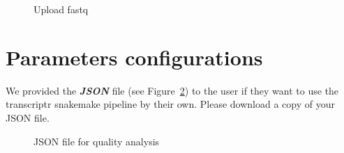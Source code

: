 \documentclass[
  a4paper,
  DIV=11,
  numbers=noendperiod,
  oneside,
  open=any]{scrreport}
\begin{document}
\begin{figure}[H]


\caption{\label{fig-qual2}Upload fastq}

\end{figure}%

\section{Parameters configurations}\label{parameters-configurations}

We provided the \textbf{\emph{JSON}} file (see Figure~\ref{fig-qual3})
to the user if they want to use the transcriptr snakemake pipeline by
their own. Please download a copy of your JSON file.

\begin{figure}[H]


\caption{\label{fig-qual3}JSON file for quality analysis}

\end{figure}%
\end{document}
